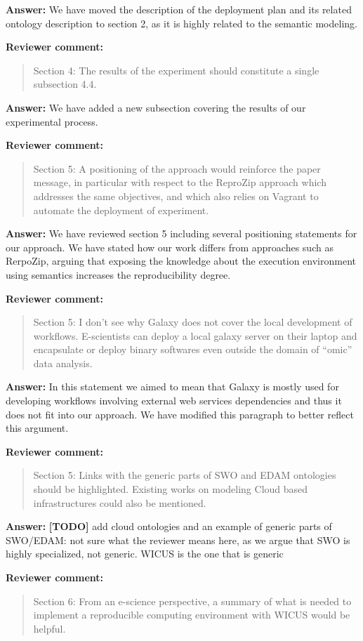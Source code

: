 \documentclass{letter}
\newenvironment{review}%
{\textbf{Reviewer comment:}\begin{quote}}%
{\end{quote}}%
\newcommand{\todo}[1]{%
      \color{red}\textbf{[TODO]} #1\color{black}}
\newcommand{\answer}[1]{%
      \textbf{Answer:} #1}
\begin{document}
\begin{letter}{}
\answer{We have moved the description of the deployment plan and its related ontology description to section 2, as it is highly related to the semantic modeling.}


\begin{review}
Section 4: The results of the experiment should constitute a single subsection 4.4.
\end{review}

\answer{We have added a new subsection covering the results of our experimental process.}


\begin{review}
Section 5: A positioning of the approach would reinforce the paper message, in particular with respect to the ReproZip approach which addresses the same objectives, and which also relies on Vagrant to automate the deployment of experiment.
\end{review}

\answer{We have reviewed section 5 including several positioning statements for our approach. We have stated how our work differs from approaches such as RerpoZip, arguing that exposing the knowledge about the execution environment using semantics increases the reproducibility degree.}


\begin{review}
Section 5: I don't see why Galaxy does not cover the local development of workflows. E-scientists can deploy a local galaxy server on their laptop and encapsulate or deploy binary softwares even outside the domain of ``omic'' data analysis.
\end{review}

\answer{In this statement we aimed to mean that Galaxy is mostly used for developing workflows involving external web services dependencies and thus it does not fit into our approach. We have modified this paragraph to better reflect this argument.}


\begin{review}
Section 5: Links with the generic parts of SWO and EDAM ontologies should be highlighted. Existing works on modeling Cloud based infrastructures could also be mentioned.
\end{review}

\answer{\todo{add cloud ontologies and an example of generic parts of SWO/EDAM: not sure what the reviewer means here, as we argue that SWO is highly specialized, not generic. WICUS is the one that is generic}}


\begin{review}
Section 6: From an e-science perspective, a summary of what is needed to implement a reproducible computing environment with WICUS would be helpful.
\end{review}


\end{letter}
\end{document}
